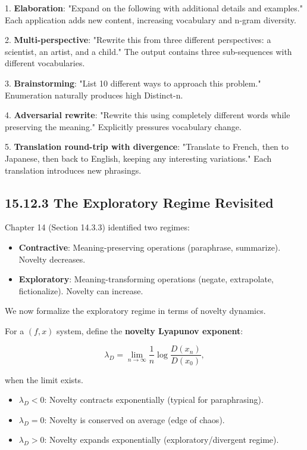 \begin{example}

1. \textbf{Elaboration}: "Expand on the following with additional details and examples." Each application adds new content, increasing vocabulary and n-gram diversity.

2. \textbf{Multi-perspective}: "Rewrite this from three different perspectives: a scientist, an artist, and a child." The output contains three sub-sequences with different vocabularies.

3. \textbf{Brainstorming}: "List 10 different ways to approach this problem." Enumeration naturally produces high Distinct-n.

4. \textbf{Adversarial rewrite}: "Rewrite this using completely different words while preserving the meaning." Explicitly pressures vocabulary change.

5. \textbf{Translation round-trip with divergence}: "Translate to French, then to Japanese, then back to English, keeping any interesting variations." Each translation introduces new phrasings.
\end{example}

\subsection{15.12.3 The Exploratory Regime Revisited}

Chapter 14 (Section 14.3.3) identified two regimes:
\begin{itemize}
\item \textbf{Contractive}: Meaning-preserving operations (paraphrase, summarize). Novelty decreases.
\item \textbf{Exploratory}: Meaning-transforming operations (negate, extrapolate, fictionalize). Novelty can increase.
\end{itemize}

We now formalize the exploratory regime in terms of novelty dynamics.

\begin{definition}
For a $(f, x)$ system, define the \textbf{novelty Lyapunov exponent}:

\[\lambda_D = \lim_{n \to \infty} \frac{1}{n} \log \frac{D(x_n)}{D(x_0)},\]

when the limit exists.

\begin{itemize}
\item $\lambda_D < 0$: Novelty contracts exponentially (typical for paraphrasing).
\item $\lambda_D = 0$: Novelty is conserved on average (edge of chaos).
\item $\lambda_D > 0$: Novelty expands exponentially (exploratory/divergent regime).
\end{itemize}
\end{definition}

